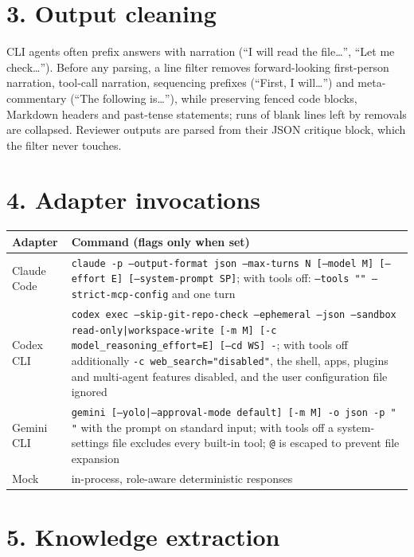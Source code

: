 \documentclass[10pt,letterpaper]{article}
\begin{document}
\section*{3. Output cleaning}

CLI agents often prefix answers with narration (``I will read the file\ldots'', ``Let me check\ldots''). Before any parsing, a line filter removes forward-looking first-person narration, tool-call narration, sequencing prefixes (``First, I will\ldots'') and meta-commentary (``The following is\ldots''), while preserving fenced code blocks, Markdown headers and past-tense statements; runs of blank lines left by removals are collapsed. Reviewer outputs are parsed from their JSON critique block, which the filter never touches.

\section*{4. Adapter invocations}

\begin{tabular}{@{}l>{\raggedright\arraybackslash}p{12cm}@{}}
\hline
Adapter & Command (flags only when set) \\ \hline
Claude Code & \texttt{claude -p --output-format json --max-turns N [--model M] [--effort E] [--system-prompt SP]}; with tools off: \texttt{--tools "" --strict-mcp-config} and one turn \\
Codex CLI & \texttt{codex exec --skip-git-repo-check --ephemeral --json --sandbox read-only|workspace-write [-m M] [-c model\_reasoning\_effort=E] [--cd WS] -}; with tools off additionally \texttt{-c web\_search="disabled"}, the shell, apps, plugins and multi-agent features disabled, and the user configuration file ignored \\
Gemini CLI & \texttt{gemini [--yolo|--approval-mode default] [-m M] -o json -p " "} with the prompt on standard input; with tools off a system-settings file excludes every built-in tool; \texttt{@} is escaped to prevent file expansion \\
Mock & in-process, role-aware deterministic responses \\ \hline
\end{tabular}

\section*{5. Knowledge extraction}
\end{document}
